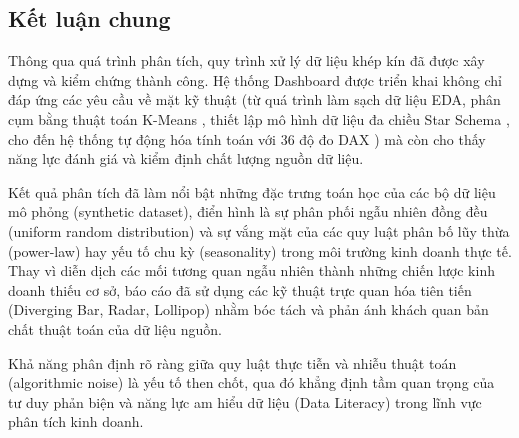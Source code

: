 \subsection{Kết luận chung}
Thông qua quá trình phân tích, quy trình xử lý dữ liệu khép kín đã được xây dựng và kiểm chứng thành công. Hệ thống Dashboard được triển khai không chỉ đáp ứng các yêu cầu về mặt kỹ thuật (từ quá trình làm sạch dữ liệu EDA, phân cụm bằng thuật toán K-Means \cite{macqueen1967}, thiết lập mô hình dữ liệu đa chiều Star Schema \cite{kimball2013}, cho đến hệ thống tự động hóa tính toán với 36 độ đo DAX \cite{dax_reference}) mà còn cho thấy năng lực đánh giá và kiểm định chất lượng nguồn dữ liệu.

Kết quả phân tích đã làm nổi bật những đặc trưng toán học của các bộ dữ liệu mô phỏng (synthetic dataset), điển hình là sự phân phối ngẫu nhiên đồng đều (uniform random distribution) và sự vắng mặt của các quy luật phân bố lũy thừa (power-law) hay yếu tố chu kỳ (seasonality) trong môi trường kinh doanh thực tế. Thay vì diễn dịch các mối tương quan ngẫu nhiên thành những chiến lược kinh doanh thiếu cơ sở, báo cáo đã sử dụng các kỹ thuật trực quan hóa tiên tiến (Diverging Bar, Radar, Lollipop) \cite{tufte2001, knaflic2015} nhằm bóc tách và phản ánh khách quan bản chất thuật toán của dữ liệu nguồn.

Khả năng phân định rõ ràng giữa quy luật thực tiễn và nhiễu thuật toán (algorithmic noise) là yếu tố then chốt, qua đó khẳng định tầm quan trọng của tư duy phản biện và năng lực am hiểu dữ liệu (Data Literacy) trong lĩnh vực phân tích kinh doanh.